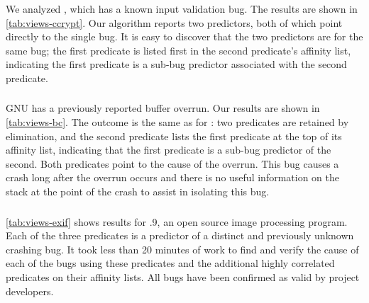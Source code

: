 We analyzed , which has a known input validation bug.  The
results are shown in \autoref{tab:views-ccrypt}.  Our algorithm
reports two predictors, both of which point directly to the single bug.
It is easy to discover that the two predictors are for the same bug;
the first predicate is listed first in the second predicate's affinity
list, indicating the first predicate is a sub-bug predictor associated
with the second predicate.

\subsubsection{\bc}


GNU  has a previously reported buffer overrun.  Our results
are shown in \autoref{tab:views-bc}.  The outcome is the same as for
\ccrypt: two predicates are retained by elimination, and the second
predicate lists the first predicate at the top of its affinity list,
indicating that the first predicate is a sub-bug predictor of the second.
Both predicates point to the cause of the overrun.  This bug causes a
crash long after the overrun occurs and there is no useful information
on the stack at the point of the crash to assist in isolating this
bug.

\subsubsection{\exif}


\autoref{tab:views-exif} shows results for .9, an open source
image processing program.  Each of the three predicates is a predictor
of a distinct and previously unknown crashing bug.  It took less than
20 minutes of work to find and verify the cause of each of the bugs
using these predicates and the additional highly correlated predicates
on their affinity lists.  All bugs have been confirmed as valid by
\exif project developers.

